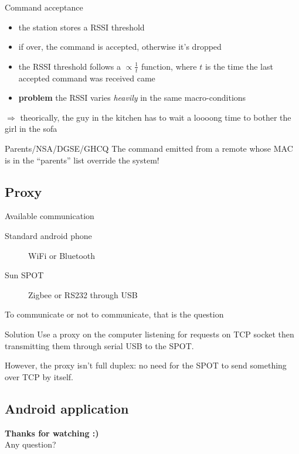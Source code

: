 \documentclass{beamer}
\begin{document}
\begin{frame}
  \begin{block}{Command acceptance}
    \begin{itemize}
    \item the station stores a RSSI threshold
    \item if over, the command is accepted, otherwise it's dropped
    \item the RSSI threshold follows a $\propto \frac 1 t$ function, where $t$ is the time the last accepted command was received came
    \item {\bfseries problem} the RSSI varies \emph{heavily} in the same macro-conditions
    \end{itemize}
    $\Rightarrow$ theorically, the guy in the kitchen has to wait a loooong time to bother the girl in the sofa
  \end{block}
\pause
  \begin{block}{Parents/NSA/DGSE/GHCQ}
    The command emitted from a remote whose MAC is in the ``parents'' list override the system!
  \end{block}
\end{frame}


\subsection{Proxy}
\begin{frame}
  \begin{block}{Available communication}
    \begin{description}
    \item[Standard android phone] WiFi or Bluetooth
    \item[Sun SPOT] Zigbee or RS232 through USB
    \end{description}
  \end{block}
  To communicate or not to communicate, that is the question
  \pause
  \begin{block}{Solution}
    Use a proxy on the computer listening for requests on TCP socket then transmitting them through serial USB to the SPOT.

    However, the proxy isn't full duplex: no need for the SPOT to send something over TCP by itself.
  \end{block}
\end{frame}


\subsection{Android application}
\begin{frame}

\end{frame}

\begin{frame}[plain]{}
  \begin{center}
    {\bfseries \large Thanks for watching :)}\\
    \vspace{2cm}
    Any question?
  \end{center}
\end{frame}
\end{document}
